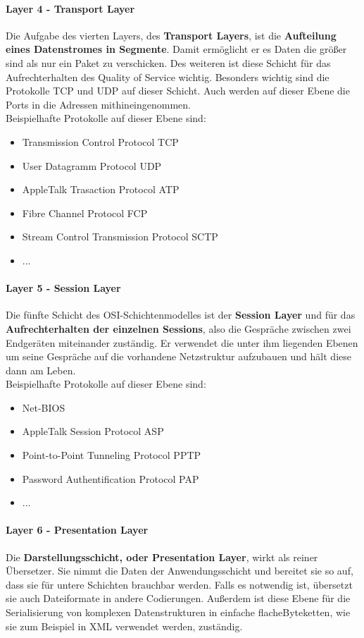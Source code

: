\documentclass[12pt,a4paper]{report}
\begin{document}
\paragraph{Layer 4 - Transport Layer}
Die Aufgabe des vierten Layers, des \textbf{Transport Layers}, ist die \textbf{Aufteilung eines Datenstromes in Segmente}. Damit ermöglicht er es Daten die größer sind als nur ein Paket zu verschicken. Des weiteren ist diese Schicht für das Aufrechterhalten des Quality of Service wichtig. Besonders wichtig sind die Protokolle TCP und UDP auf dieser Schicht. Auch werden auf dieser Ebene die Ports in die Adressen mithineingenommen.\\

Beispielhafte Protokolle auf dieser Ebene sind:
\begin{itemize}
\item Transmission Control Protocol TCP
\item User Datagramm Protocol UDP
\item AppleTalk Trasaction Protocol ATP
\item Fibre Channel Protocol FCP
\item Stream Control Transmission Protocol SCTP
\item ...
\end{itemize}

\paragraph{Layer 5 - Session Layer}
Die fünfte Schicht des OSI-Schichtenmodelles ist der \textbf{Session Layer} und für das \textbf{Aufrechterhalten der einzelnen Sessions}, also die Gespräche zwischen zwei Endgeräten miteinander zuständig. Er verwendet die unter ihm liegenden Ebenen um seine Gespräche auf die vorhandene Netzstruktur aufzubauen und hält diese dann am Leben.\\

Beispielhafte Protokolle auf dieser Ebene sind:
\begin{itemize}
\item Net-BIOS
\item AppleTalk Session Protocol ASP
\item Point-to-Point Tunneling Protocol PPTP
\item Password Authentification Protocol PAP
\item ...
\end{itemize}

\paragraph{Layer 6 - Presentation Layer}
Die \textbf{Darstellungsschicht, oder Presentation Layer}, wirkt als reiner Übersetzer. Sie nimmt die Daten der Anwendungsschicht und bereitet sie so auf, dass sie für untere Schichten brauchbar werden. Falls es notwendig ist, übersetzt sie auch Dateiformate in andere Codierungen. Außerdem ist diese Ebene für die Serialisierung von komplexen Datenstrukturen in einfache \glqq flache\grqq  Byteketten, wie sie zum Beispiel in XML verwendet werden, zuständig.\\
\end{document}
